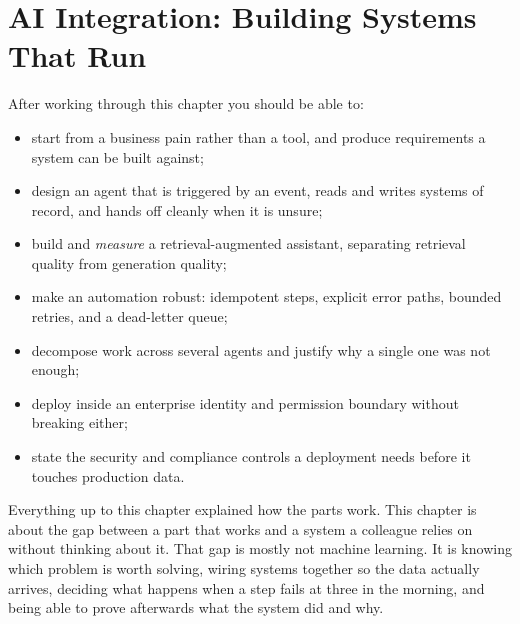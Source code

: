 
\chapter{AI Integration: Building Systems That Run}
\label{ch:ai-integration}


\begin{learningobjectives}
After working through this chapter you should be able to:
\begin{itemize}
  \item start from a business pain rather than a tool, and produce
        requirements a system can be built against;
  \item design an agent that is triggered by an event, reads and writes
        systems of record, and hands off cleanly when it is unsure;
  \item build and \emph{measure} a retrieval-augmented assistant, separating
        retrieval quality from generation quality;
  \item make an automation robust: idempotent steps, explicit error paths,
        bounded retries, and a dead-letter queue;
  \item decompose work across several agents and justify why a single one was
        not enough;
  \item deploy inside an enterprise identity and permission boundary without
        breaking either;
  \item state the security and compliance controls a deployment needs before
        it touches production data.
\end{itemize}
\end{learningobjectives}

\begin{plainlanguage}
Everything up to this chapter explained how the parts work. This chapter is
about the gap between a part that works and a system a colleague relies on
without thinking about it. That gap is mostly not machine learning. It is
knowing which problem is worth solving, wiring systems together so the data
actually arrives, deciding what happens when a step fails at three in the
morning, and being able to prove afterwards what the system did and why.
\end{plainlanguage}

